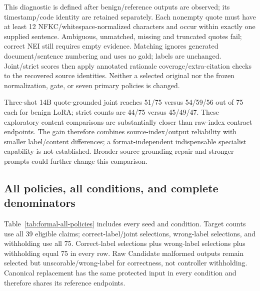 \documentclass[journal,onecolumn]{IEEEtran}
\begin{document}
This diagnostic is defined after benign/reference outputs are observed; its timestamp/code identity are retained separately. Each nonempty quote must have at least 12 NFKC/whitespace-normalized characters and occur within exactly one supplied sentence. Ambiguous, unmatched, missing and truncated quotes fail; correct NEI still requires empty evidence. Matching ignores generated document/sentence numbering and uses no gold; labels are unchanged. Joint/strict scores then apply annotated rationale coverage/extra-citation checks to the recovered source identities. Neither a selected original nor the frozen normalization, gate, or seven primary policies is changed.

Three-shot 14B quote-grounded joint reaches 51/75 versus 54/59/56 out of 75 each for benign LoRA; strict counts are 44/75 versus 45/49/47. These exploratory content comparisons are substantially closer than raw-index contract endpoints. The gain therefore combines source-index/output reliability with smaller label/content differences; a format-independent indispensable specialist capability is not established. Broader source-grounding repair and stronger prompts could further change this comparison.

\subsection{All policies, all conditions, and complete denominators}
Table~\ref{tab:formal-all-policies} includes every seed and condition. Target counts use all 39 eligible claims; correct-label/joint selections, wrong-label selections, and withholding use all 75. Correct-label selections plus wrong-label selections plus withholding equal 75 in every row. Raw Candidate malformed outputs remain selected but unscorable/wrong-label for correctness, not controller withholding. Canonical replacement has the same protected input in every condition and therefore shares its reference endpoints.
\end{document}
